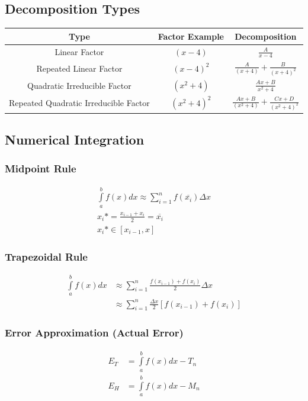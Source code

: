 \documentclass[12pt, letterpaper]{article}
\begin{document}
\subsection{Decomposition Types}
\begin{center}
\begin{tabular}{c c c}
Type & Factor Example & Decomposition\\
\hline
Linear Factor & $(x-4)$ & $\frac{A}{x-4}$\\
Repeated Linear Factor & $(x-4)^2$ & $\frac{A}{(x+4)} + \frac{B}{(x+4)^2}$\\
Quadratic Irreducible Factor & $(x^2+4)$ & $\frac{Ax+B}{x^2+4}$\\
Repeated Quadratic Irreducible Factor & $(x^2+4)^2$ & $\frac{Ax+B}{(x^2+4)} + \frac{Cx+D}{(x^2+4)^2}$
\end{tabular}
\end{center}

\subsection{Numerical Integration}
\subsubsection{Midpoint Rule}
\begin{gather*}
  \int \limits _{a}^{b} f(x) dx \approx \sum _{i=1}^{n} f(\overline{x_i}) \Delta x\\
  x_i * = \frac{x_{i-1} + x_i}{2} = \overline{x_i}\\
  x_i * \in [x_{i-1}, x]
\end{gather*}

\subsubsection{Trapezoidal Rule}
\begin{equation*}
\begin{split}
  \int \limits _{a}^{b} f(x) dx &\approx \sum _{i=1}^{n} \frac{f(x_{i-1})+f(x_i)}{2} \Delta x\\
  &\approx \sum _{i=1}^{n} \frac{\Delta x}{2} [f(x_{i-1})+f(x_i)]
\end{split}
\end{equation*}

\subsubsection{Error Approximation (Actual Error)}
\begin{equation*}
  \begin{split}
    E_T &= \int \limits _{a}^{b} f(x)dx - T_n\\
    E_H &= \int \limits _{a}^{b} f(x)dx - M_n
  \end{split}
\end{equation*}
\end{document}

